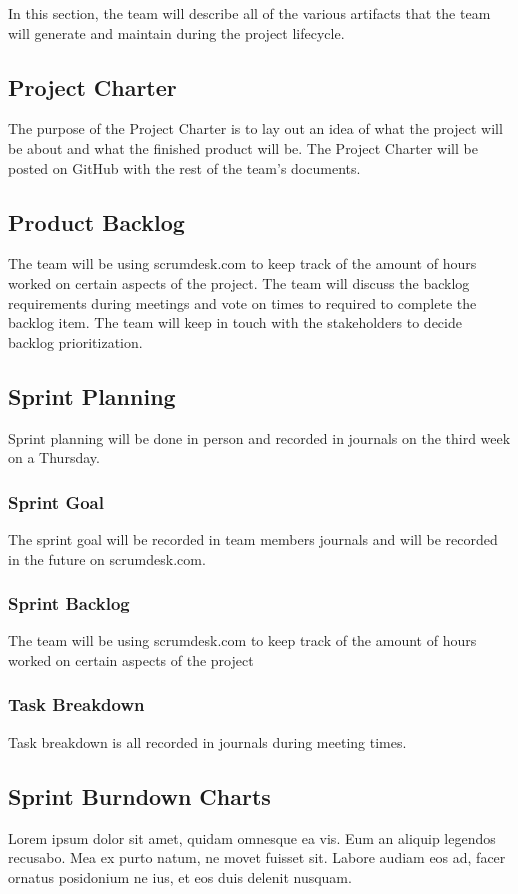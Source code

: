 In this section, the team will describe all of the various artifacts that the team will generate and maintain during the project lifecycle.

\subsection{Project Charter}
The purpose of the Project Charter is to lay out an idea of what the project will be about and what the finished product will be. The Project Charter will be posted on GitHub with the rest of the team's documents.

\subsection{Product Backlog}
The team will be using scrumdesk.com to keep track of the amount of hours worked on certain aspects of the project. The team will discuss the backlog requirements during meetings and vote on times to required to complete the backlog item. The team will keep in touch with the stakeholders to decide backlog prioritization.

\subsection{Sprint Planning}
Sprint planning will be done in person and recorded in journals on the third week on a Thursday.

\subsubsection{Sprint Goal}
The sprint goal will be recorded in team members journals and will be recorded in the future on scrumdesk.com.

\subsubsection{Sprint Backlog}
The team will be using scrumdesk.com to keep track of the amount of hours worked on certain aspects of the project

\subsubsection{Task Breakdown}
Task breakdown is all recorded in journals during meeting times.

\subsection{Sprint Burndown Charts}
Lorem ipsum dolor sit amet, quidam omnesque ea vis. Eum an aliquip legendos recusabo. Mea ex purto natum, ne movet fuisset sit. Labore audiam eos ad, facer ornatus posidonium ne ius, et eos duis delenit nusquam.

